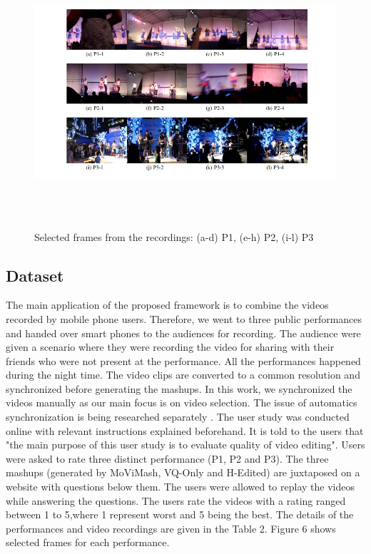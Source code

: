 \documentclass{sig-alternate}
\begin{document}
\begin{figure}[!htb]
  \includegraphics[width=\linewidth , height=10cm]{image6}
  \caption{Selected frames from the recordings: (a-d) P1, (e-h) P2, (i-l) P3}\label{fig:awesome_image1}
\endminipage

\end{figure}





\subsection{Dataset}
The main application of the proposed framework is to combine the videos recorded by mobile phone users. Therefore, we went to three public performances and handed over smart phones to the audiences for recording. The audience were given a scenario where they were recording the video for sharing with their friends who were not present at the performance. All the performances happened during the night time. The video clips are converted to a common resolution and synchronized before generating the mashups. In this work, we synchronized the videos manually as our main focus is on video selection. The issue of automatics synchronization is being researched separately \cite{frakes1992information}. The user study was conducted online with relevant instructions explained beforehand. It is told to the users that "the main purpose of this user study is to evaluate quality of video editing". Users were asked to rate three distinct performance (P1, P2 and P3). The three mashups (generated by MoViMash, VQ-Only and H-Edited) are juxtaposed on a website with questions below them. The users were allowed to replay the videos while answering the questions. The users rate the videos with a rating ranged between 1 to 5,where 1 represent worst and 5 being the best. The details of the performances and video recordings are given in the Table 2. Figure 6 shows selected frames for each performance.
\end{document}

